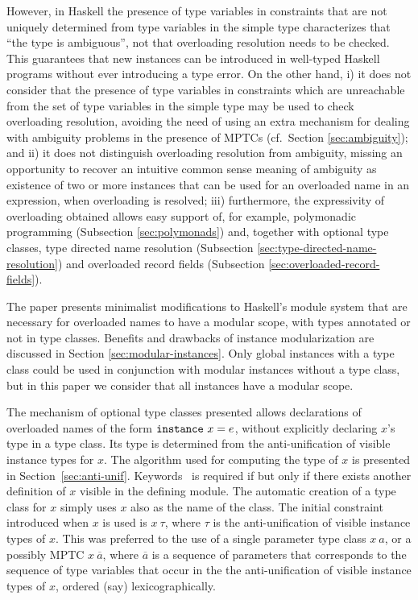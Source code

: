However, in Haskell the presence of type variables in constraints that
are not uniquely determined from type variables in the simple type
characterizes that ``the type is ambiguous'', not that overloading
resolution needs to be checked.  This guarantees that new instances
can be introduced in well-typed Haskell programs without ever
introducing a type error. On the other hand, i) it does not consider
that the presence of type variables in constraints which are
unreachable from the set of type variables in the simple type may be
used to check overloading resolution, avoiding the need of using an
extra mechanism for dealing with ambiguity problems in the presence of
MPTCs (cf.~Section \ref{sec:ambiguity}); and ii) it does not
distinguish overloading resolution from ambiguity, missing an
opportunity to recover an intuitive common sense meaning of ambiguity
as existence of two or more instances that can be used for an
overloaded name in an expression, when overloading is resolved; iii)
furthermore, the expressivity of overloading obtained allows easy
support of, for example, polymonadic programming (Subsection
\ref{sec:polymonads}) and, together with optional type classes, type
directed name resolution (Subsection
\ref{sec:type-directed-name-resolution}) and overloaded record fields
(Subsection \ref{sec:overloaded-record-fields}).

The paper presents minimalist modifications to Haskell's module system
that are necessary for overloaded names to have a modular scope, with
types annotated or not in type classes. Benefits and drawbacks of
instance modularization are discussed in Section
\ref{sec:modular-instances}. Only global instances with a type class
could be used in conjunction with modular instances without a type
class, but in this paper we consider that all instances have a modular
scope.

The mechanism of optional type classes presented allows declarations
of overloaded names of the form $\instance\ x=e$, without explicitly
declaring $x$'s type in a type class.  Its type is determined from the
anti-unification of visible instance types for $x$. The algorithm used
for computing the type of $x$ is presented in
Section~\ref{sec:anti-unif}.  Keywords \instance\ is required if but
only if there exists another definition of $x$ visible in the defining
module. The automatic creation of a type class for $x$ simply uses $x$
also as the name of the class. The initial constraint introduced when
$x$ is used is $x\:\tau$, where $\tau$ is the anti-unification of
visible instance types of $x$. This was preferred to the use of a
single parameter type class $x\: a$, or a possibly MPTC
$x\:\overline{a}$, where $\overline{a}$ is a sequence of parameters
that corresponds to the sequence of type variables that occur in the
the anti-unification of visible instance types of $x$, ordered (say)
lexicographically.

